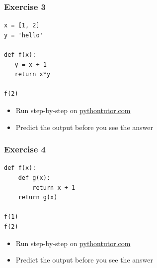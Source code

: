\documentclass[14pt,compress]{beamer}
\begin{document}
\begin{frame}[fragile]
  \frametitle{Exercise 3}
\begin{lstlisting}
x = [1, 2]
y = 'hello'

def f(x):
   y = x + 1
   return x*y

f(2)
\end{lstlisting}
\vspace*{0.1in}
  \begin{itemize}
  \item Run step-by-step on \url{pythontutor.com}
  \item Predict the output before you see the answer
  \end{itemize}

\end{frame}

\begin{frame}[fragile]
  \frametitle{Exercise 4}
\begin{lstlisting}
def f(x):
    def g(x):
        return x + 1
    return g(x)

f(1)
f(2)
\end{lstlisting}
\vspace*{0.1in}
  \begin{itemize}
  \item Run step-by-step on \url{pythontutor.com}
  \item Predict the output before you see the answer
  \end{itemize}

\end{frame}
\end{document}
